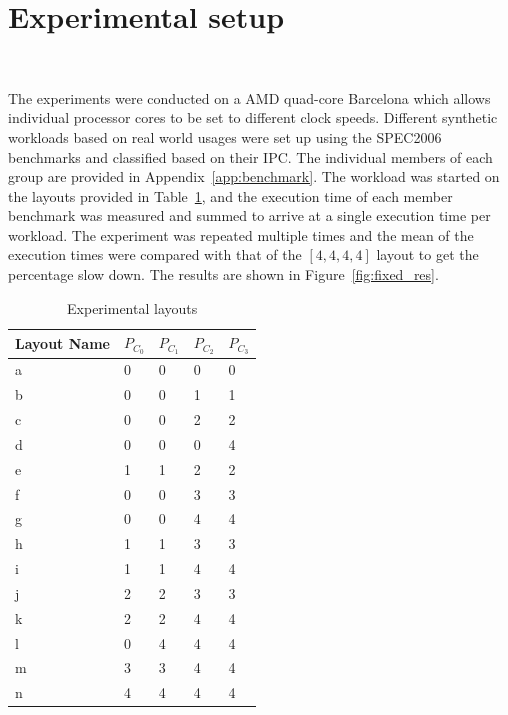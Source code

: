 \section{Experimental setup}~\label{sec:pds_exp}

The experiments were conducted on a AMD quad-core Barcelona which allows individual
processor cores to be set to different clock speeds. Different synthetic workloads
based on real world usages were set up using the SPEC2006 benchmarks and classified based on their IPC. The 
individual members of each group are provided in Appendix~\ref{app:benchmark}. The workload was started
on the layouts provided in Table~\ref{tab:proc_layouts}, and the execution time of each
member benchmark was measured and summed to arrive at a single execution time per 
workload. The experiment was repeated multiple times and the mean of the execution times were 
compared with that of the $[4,4,4,4]$ layout to get the percentage slow down. 
The results are shown in Figure~\ref{fig:fixed_res}.  

\begin{table}[h!]
 \begin{center}
\begin{tabular}{| l | l | l | l | l | }
\hline	
Layout Name & $P_{C_{0}}$ & $P_{C_{1}}$ & $P_{C_{2}}$ & $P_{C_{3}}$ \\
\hline
a & 0 & 0 & 0 & 0 \\
b & 0 & 0 & 1 & 1 \\
c & 0 & 0 & 2 & 2 \\
d & 0 & 0 & 0 & 4 \\
e & 1 & 1 & 2 & 2 \\
f & 0 & 0 & 3 & 3 \\
g & 0 & 0 & 4 & 4 \\
h & 1 & 1 & 3 & 3 \\
i & 1 & 1 & 4 & 4 \\
j & 2 & 2 & 3 & 3 \\ 
k & 2 & 2 & 4 & 4 \\ 
l & 0 & 4 & 4 & 4 \\
m & 3 & 3 & 4 & 4 \\
n & 4 & 4 & 4 & 4 \\
\hline  
\end{tabular}
 \end{center}
\caption{Experimental layouts}
\label{tab:proc_layouts}
\end{table}

